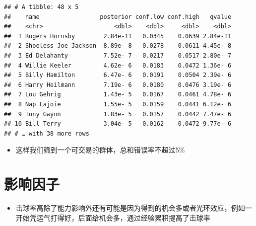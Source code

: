 \documentclass[]{book}
\newenvironment{Shaded}{\begin{snugshade}}{\end{snugshade}}
\newcommand{\CommentTok}[1]{\textcolor[rgb]{0.56,0.35,0.01}{\textit{#1}}}
\newcommand{\DataTypeTok}[1]{\textcolor[rgb]{0.13,0.29,0.53}{#1}}
\newcommand{\FloatTok}[1]{\textcolor[rgb]{0.00,0.00,0.81}{#1}}
\newcommand{\KeywordTok}[1]{\textcolor[rgb]{0.13,0.29,0.53}{\textbf{#1}}}
\newcommand{\NormalTok}[1]{#1}
\newcommand{\OperatorTok}[1]{\textcolor[rgb]{0.81,0.36,0.00}{\textbf{#1}}}
\newcommand{\StringTok}[1]{\textcolor[rgb]{0.31,0.60,0.02}{#1}}
\providecommand{\tightlist}{%
  \setlength{\itemsep}{0pt}\setlength{\parskip}{0pt}}
\begin{document}
\begin{Shaded}
\end{Shaded}

\begin{verbatim}
## # A tibble: 48 x 5
##    name                 posterior conf.low conf.high   qvalue
##    <chr>                    <dbl>    <dbl>     <dbl>    <dbl>
##  1 Rogers Hornsby        2.84e-11   0.0345    0.0639 2.84e-11
##  2 Shoeless Joe Jackson  8.89e- 8   0.0278    0.0611 4.45e- 8
##  3 Ed Delahanty          7.52e- 7   0.0217    0.0517 2.80e- 7
##  4 Willie Keeler         4.62e- 6   0.0183    0.0472 1.36e- 6
##  5 Billy Hamilton        6.47e- 6   0.0191    0.0504 2.39e- 6
##  6 Harry Heilmann        7.19e- 6   0.0180    0.0476 3.19e- 6
##  7 Lou Gehrig            1.43e- 5   0.0167    0.0461 4.78e- 6
##  8 Nap Lajoie            1.55e- 5   0.0159    0.0441 6.12e- 6
##  9 Tony Gwynn            1.83e- 5   0.0157    0.0442 7.47e- 6
## 10 Bill Terry            3.04e- 5   0.0162    0.0472 9.77e- 6
## # … with 38 more rows
\end{verbatim}

\begin{itemize}
\tightlist
\item
  这样我们筛到一个可交易的群体，总和错误率不超过5\%
\end{itemize}

\hypertarget{ux5f71ux54cdux56e0ux5b50}{%
\section{影响因子}\label{ux5f71ux54cdux56e0ux5b50}}

\begin{itemize}
\tightlist
\item
  击球率高除了能力影响外还有可能是因为得到的机会多或者光环效应，例如一开始凭运气打得好，后面给机会多，通过经验累积提高了击球率
\end{itemize}
\end{document}
